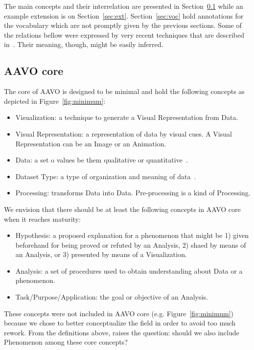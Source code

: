 \documentclass[12pt,fleqn]{article}
\begin{document}
The main concepts and their interrelation are presented in
Section~\ref{sec:core} while an example extension is on Section~\ref{sec:ext}.
Section~\ref{sec:voc} hold annotations for the vocabulary which are not promptly
given by the previous sections.
Some of the relations bellow were expressed by very recent 
techniques that are described in~\cite{enhance}.
Their meaning, though, might be easily inferred.

\subsection{AAVO core}\label{sec:core}
The core of AAVO is designed to be minimal and hold the following concepts as
depicted in Figure~\ref{fig:minimum}:
\begin{itemize}
	\item Visualization: a technique to generate a Visual Representation from Data.
	\item Visual Representation: a representation of data by visual cues.
		A Visual Representation can be an Image or an Animation.
	\item Data: a set o values be them qualitative or quantitative~\citep{wikipData}.
	\item Dataset Type: a type of organization and meaning of data~\cite{munzner}.
	\item Processing: transforms Data into Data. Pre-processing is a kind of Processing.
\end{itemize}

We envision that there should be at least the following concepts in
AAVO core when it reaches maturity:
\begin{itemize}
	\item Hypothesis: a proposed explanation for a phenomenon that might be
		1) given beforehand for being proved or refuted by an Analysis,
		2) shaed by means of an Analysis,
		or 3) presented by means of a Visualization.
	\item Analysis: a set of procedures used to obtain understanding about
		Data or a phenomenon.
	\item Task/Purpose/Application: the goal or objective of an Analysis.
\end{itemize}
\noindent These concepts were not included in AAVO core (e.g. Figure~\ref{fig:minimum})
because we chose to better conceptualize the field in order to avoid too much rework.
From the definitions above, raises the question:
should we also include Phenomenon among these core concepts?
\end{document}
